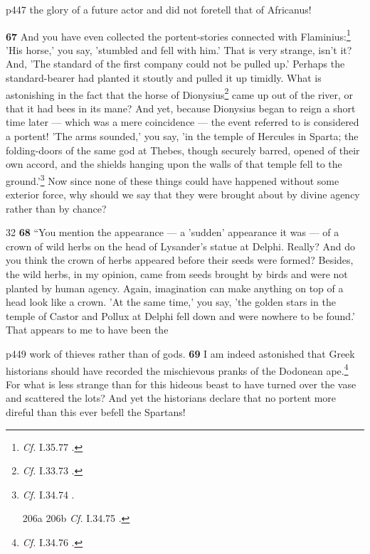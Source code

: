 p447 the glory of a future actor and did not foretell that of Africanus!

\textbf{67} And you have even collected the portent-stories connected with Flaminius:\texthebrew{}\footnote{\emph{Cf.}
I.35.77 .

} 'His horse,' you say, 'stumbled and fell with him.' That is very strange, isn't it? And, 'The standard of the first company could not be pulled up.' Perhaps the standard-bearer had planted it stoutly and pulled it up timidly. What is astonishing in the fact that the horse of Dionysius\texthebrew{}\footnote{\emph{Cf.}
I.33.73 .

} came up out of the river, or that it had bees in its mane? And yet, because Dionysius began to reign a short time later \texthebrew{—} which was a mere coincidence \texthebrew{—} the event referred to is considered a portent! 'The arms sounded,' you say, 'in the temple of Hercules in Sparta; the folding-doors of the same god at Thebes, though securely barred, opened of their own accord, and the shields hanging upon the walls of that temple fell to the ground.'\texthebrew{}\footnote{\emph{Cf.}
I.34.74 .



206a
206b
\emph{Cf.}
I.34.75 .

} Now since none of these things could have happened without some exterior force, why should we say that they were brought about by divine agency rather than by chance?

32
\textbf{68} ``You mention the appearance \texthebrew{—} a 'sudden' appearance it was \texthebrew{—} of a crown of wild herbs on the head of Lysander's statue at Delphi.\texthebrew{} Really? And do you think the crown of herbs appeared before their seeds were formed? Besides, the wild herbs, in my opinion, came from seeds brought by birds and were not planted by human agency. Again, imagination can make anything on top of a head look like a crown. 'At the same time,' you say, 'the golden stars in the temple of Castor and Pollux at Delphi fell down and were nowhere to be found.'\texthebrew{} That appears to me to have been the

p449 work of thieves rather than of gods. \textbf{69} I am indeed astonished that Greek historians should have recorded the mischievous pranks of the Dodonean ape.\texthebrew{}\footnote{\emph{Cf.}
I.34.76 .

} For what is less strange than for this hideous beast to have turned over the vase and scattered the lots? And yet the historians declare that no portent more direful than this ever befell the Spartans!

